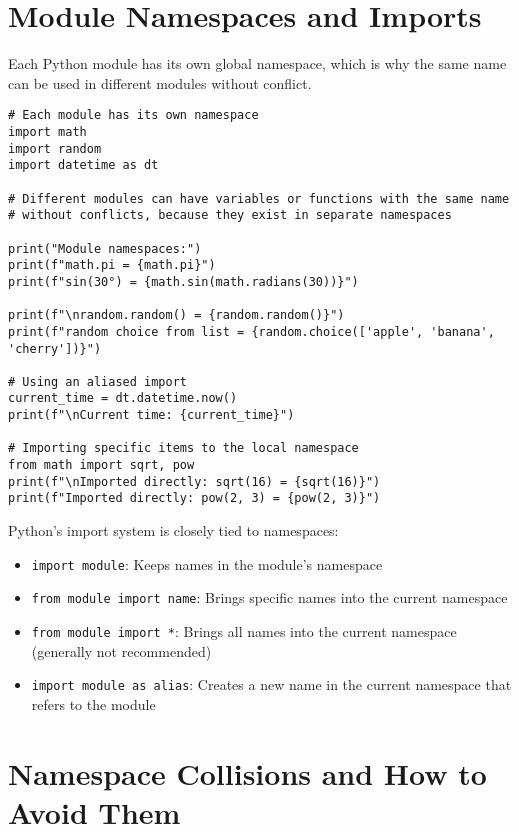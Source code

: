 \documentclass[12pt,letterpaper]{article}
\newenvironment{macterminal}{%
    \begin{mdframed}[
        linecolor=terminalFrame,
        backgroundcolor=terminalBg,
        roundcorner=5pt,
        skipabove=10pt,
        skipbelow=10pt,
        linewidth=1pt,
        innertopmargin=10pt, %
        frametitle={%
            \tikz[baseline=(current bounding box.east), outer sep=0pt]{
                \fill[red!80!black] (0,0) circle (5pt);
                \fill[yellow!80!black] (0.7,0) circle (5pt);
                \fill[green!70!black] (1.4,0) circle (5pt);
            }
        },
        frametitlealignment=\raggedright, %
        frametitleaboveskip=8pt, %
        frametitlebelowskip=0pt, %
    ]
}{%
    \end{mdframed}%
}
\begin{document}
\section{Module Namespaces and Imports}

Each Python module has its own global namespace, which is why the same name can be used in different modules without conflict.

\begin{macterminal}
\begin{lstlisting}
# Each module has its own namespace
import math
import random
import datetime as dt

# Different modules can have variables or functions with the same name
# without conflicts, because they exist in separate namespaces

print("Module namespaces:")
print(f"math.pi = {math.pi}")
print(f"sin(30°) = {math.sin(math.radians(30))}")

print(f"\nrandom.random() = {random.random()}")
print(f"random choice from list = {random.choice(['apple', 'banana', 'cherry'])}")

# Using an aliased import
current_time = dt.datetime.now()
print(f"\nCurrent time: {current_time}")

# Importing specific items to the local namespace
from math import sqrt, pow
print(f"\nImported directly: sqrt(16) = {sqrt(16)}")
print(f"Imported directly: pow(2, 3) = {pow(2, 3)}")
\end{lstlisting}
\end{macterminal}

Python's import system is closely tied to namespaces:
\begin{itemize}
    \item \texttt{import module}: Keeps names in the module's namespace
    \item \texttt{from module import name}: Brings specific names into the current namespace
    \item \texttt{from module import *}: Brings all names into the current namespace (generally not recommended)
    \item \texttt{import module as alias}: Creates a new name in the current namespace that refers to the module
\end{itemize}

\section{Namespace Collisions and How to Avoid Them}
\end{document}
